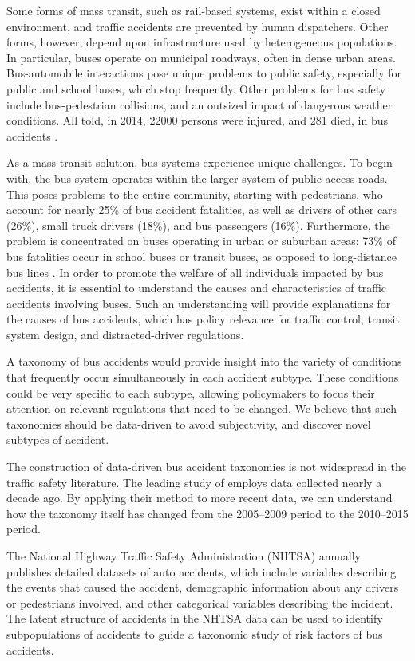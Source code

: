 
Some forms of mass transit, such as rail-based systems, exist within a
closed environment, and traffic accidents are prevented by human
dispatchers. Other forms, however, depend upon infrastructure used by
heterogeneous populations. In particular, buses operate on municipal
roadways, often in dense urban areas. Bus-automobile interactions pose
unique problems to public safety, especially for public and school
buses, which stop frequently. Other problems for bus safety include
bus-pedestrian collisions, and an outsized impact of dangerous weather
conditions. All told, in 2014, 22000 persons were injured, and 281
died, in bus accidents \citep{truckfacts}.

As a mass transit solution, bus systems experience unique
challenges. To begin with, the bus system operates within the larger
system of public-access roads. This poses problems to the entire
community, starting with pedestrians, who account for nearly 25\% of
bus accident fatalities, as well as drivers of other cars (26\%),
small truck drivers (18\%), and bus passengers (16\%). Furthermore, the
problem is concentrated on buses operating in urban or suburban areas:
73\% of bus fatalities occur in school buses or transit buses, as
opposed to long-distance bus lines \citep{truckfacts}. In order to
promote the welfare of all individuals impacted by bus accidents, it
is essential to understand the causes and characteristics of traffic
accidents involving buses. Such an understanding will provide
explanations for the causes of bus accidents, which has policy
relevance for traffic control, transit system design, and
distracted-driver regulations.

A taxonomy of bus accidents would provide insight into the variety of
conditions that frequently occur simultaneously in each accident
subtype.  These conditions could be very specific to each subtype,
allowing policymakers to focus their attention on relevant regulations
that need to be changed. We believe that such taxonomies should be
data-driven to avoid subjectivity, and discover novel subtypes of
accident.

The construction of data-driven bus accident taxonomies is not
widespread in the traffic safety literature. The leading study of
\cite{prato2013bus} employs data collected nearly a decade ago. By
applying their method to more recent data, we can understand how the
taxonomy itself has changed from the 2005--2009 period to the
2010--2015 period.

The National Highway Traffic Safety Administration (NHTSA) annually
publishes detailed datasets of auto accidents, which include variables
describing the events that caused the accident, demographic
information about any drivers or pedestrians involved, and other
categorical variables describing the incident. The latent structure of
accidents in the NHTSA data can be used to identify subpopulations of accidents to
guide a taxonomic study of risk factors of bus accidents.

